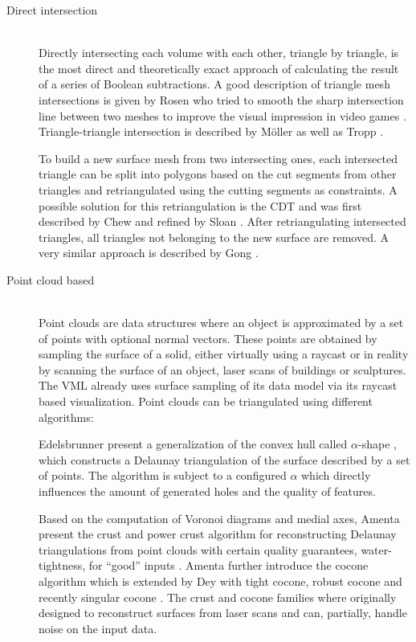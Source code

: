 \begin{description}
	\item[Direct intersection] \hfill \\
	Directly intersecting each volume with each other, triangle by triangle, is the most direct and theoretically exact approach of calculating the result of a series of Boolean subtractions.
	A good description of triangle mesh intersections is given by Rosen who tried to smooth the sharp intersection line between two meshes to improve the visual impression in video games \cite{mesh_intersection}.
	Triangle-triangle intersection is described by Möller \cite{tri_tri_intersection_moller} as well as Tropp \etal \cite{tri_tri_intersection_2}.

	To build a new surface mesh from two intersecting ones, each intersected triangle can be split into polygons based on the cut segments from other triangles and retriangulated using the cutting segments as constraints.
	A possible solution for this retriangulation is the CDT and was first described by Chew \cite{cdt} and refined by Sloan \cite{cdt_fast}.
	After retriangulating intersected triangles, all triangles not belonging to the new surface are removed.
	A very similar approach is described by Gong \cite{cutter_workpiece_engagement}.


	\item[Point cloud based] \hfill \\
	Point clouds are data structures where an object is approximated by a set of points with optional normal vectors.
	These points are obtained by sampling the surface of a solid, either virtually using a raycast or in reality by scanning the surface of an object, \eg laser scans of buildings or sculptures.
	The VML already uses surface sampling of its data model via its raycast based visualization.
	Point clouds can be triangulated using different algorithms:

	Edelsbrunner \etal present a generalization of the convex hull called $\alpha$-shape \cite{alpha_shape}, which constructs a Delaunay triangulation of the surface described by a set of points.
	The algorithm is subject to a configured $\alpha$ which directly influences the amount of generated holes and the quality of features.

	Based on the computation of Voronoi diagrams and medial axes, Amenta \etal present the crust and power crust algorithm for reconstructing Delaunay triangulations from point clouds with certain quality guarantees, \eg water-tightness, for \enquote{good} inputs \cite{crust, power_crust}.
	Amenta \etal further introduce the cocone algorithm \cite{cocone} which is extended by Dey \etal with tight cocone, robust cocone and recently singular cocone \cite{tight_cocone, robust_cocone, singular_cocone}.
	The crust and cocone families where originally designed to reconstruct surfaces from laser scans and can, partially, handle noise on the input data.


\end{description}
